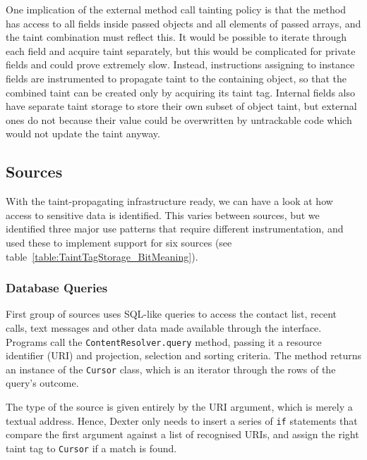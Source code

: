 \documentclass[12pt,twoside,notitlepage]{report}
\begin{document}
One implication of the external method call tainting policy is that the method has access to all fields inside passed objects and all elements of passed arrays, and the taint combination must reflect this. It would be possible to iterate through each field and acquire taint separately, but this would be complicated for private fields and could prove extremely slow. Instead, instructions assigning to instance fields are instrumented to propagate taint to the containing object, so that the combined taint can be created only by acquiring its taint tag. Internal fields also have separate taint storage to store their own subset of object taint, but external ones do not because their value could be overwritten by untrackable code which would not update the taint anyway.

\subsection{Sources}

With the taint-propagating infrastructure ready, we can have a look at how access to sensitive data is identified. This varies between sources, but we identified three major use patterns that require different instrumentation, and used these to implement support for six sources (see table~\ref{table:TaintTagStorage_BitMeaning}).

\subsubsection{Database Queries}

First group of sources uses SQL-like queries to access the contact list, recent calls, text messages and other data made available through the interface. Programs call the \verb$ContentResolver.query$ method, passing it a resource identifier (URI) and projection, selection and sorting criteria. The method returns an instance of the \verb$Cursor$ class, which is an iterator through the rows of the query's outcome. 

The type of the source is given entirely by the URI argument, which is merely a textual address. Hence, Dexter only needs to insert a series of \verb$if$ statements that compare the first argument against a list of recognised URIs, and assign the right taint tag to \verb$Cursor$ if a match is found.
\end{document}
